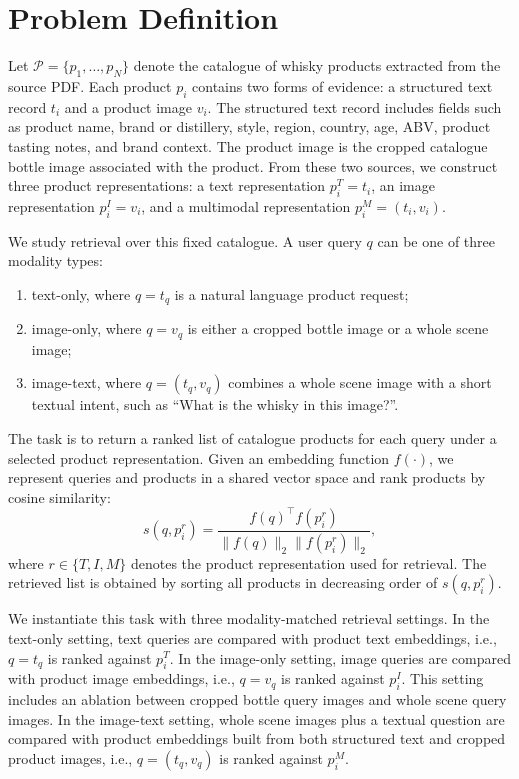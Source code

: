 \section{Problem Definition}

Let $\mathcal{P}=\{p_1,\ldots,p_N\}$ denote the catalogue of whisky products extracted from the source PDF. Each product $p_i$ contains two forms of evidence: a structured text record $t_i$ and a product image $v_i$. The structured text record includes fields such as product name, brand or distillery, style, region, country, age, ABV, product tasting notes, and brand context. The product image is the cropped catalogue bottle image associated with the product. From these two sources, we construct three product representations: a text representation $p_i^{T}=t_i$, an image representation $p_i^{I}=v_i$, and a multimodal representation $p_i^{M}=(t_i,v_i)$.

We study retrieval over this fixed catalogue. A user query $q$ can be one of three modality types:
\begin{enumerate}
    \item text-only, where $q=t_q$ is a natural language product request;
    \item image-only, where $q=v_q$ is either a cropped bottle image or a whole scene image;
    \item image-text, where $q=(t_q,v_q)$ combines a whole scene image with a short textual intent, such as ``What is the whisky in this image?''.
\end{enumerate}

The task is to return a ranked list of catalogue products for each query under a selected product representation. Given an embedding function $f(\cdot)$, we represent queries and products in a shared vector space and rank products by cosine similarity:
\[
    s(q,p_i^{r})=
    \frac{f(q)^\top f(p_i^{r})}
    {\lVert f(q)\rVert_2 \lVert f(p_i^{r})\rVert_2},
\]
where $r \in \{T,I,M\}$ denotes the product representation used for retrieval. The retrieved list is obtained by sorting all products in decreasing order of $s(q,p_i^{r})$.

We instantiate this task with three modality-matched retrieval settings. In the text-only setting, text queries are compared with product text embeddings, i.e., $q=t_q$ is ranked against $p_i^{T}$. In the image-only setting, image queries are compared with product image embeddings, i.e., $q=v_q$ is ranked against $p_i^{I}$. This setting includes an ablation between cropped bottle query images and whole scene query images. In the image-text setting, whole scene images plus a textual question are compared with product embeddings built from both structured text and cropped product images, i.e., $q=(t_q,v_q)$ is ranked against $p_i^{M}$.

